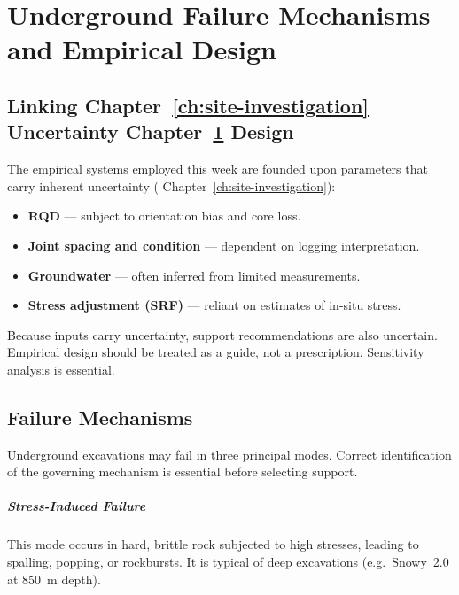 \chapter{Underground Failure Mechanisms and Empirical Design}
\label{ch:empirical-support}

\section{Linking Chapter~\ref{ch:site-investigation} Uncertainty Chapter~\ref{ch:empirical-support} Design}
The empirical systems employed this week are founded upon parameters that carry inherent uncertainty ( Chapter~\ref{ch:site-investigation}):
\begin{itemize}
 \item \textbf{RQD} --- subject to orientation bias and core loss.
 \item \textbf{Joint spacing and condition} --- dependent on logging interpretation.
 \item \textbf{Groundwater} --- often inferred from limited measurements.
 \item \textbf{Stress adjustment (SRF)} --- reliant on estimates of in-situ stress.
\end{itemize}

\begin{warnbox}
Because inputs carry uncertainty, support recommendations are also uncertain. Empirical design should be treated as a guide, not a prescription. Sensitivity analysis is essential.
\end{warnbox}

\section{Failure Mechanisms}
Underground excavations may fail in three principal modes. Correct identification of the governing mechanism is essential before selecting support.

\paragraph{Stress-Induced Failure}
This mode occurs in hard, brittle rock subjected to high stresses, leading to spalling, popping, or rockbursts. It is typical of deep excavations (e.g.\ Snowy~2.0 at 850~m depth).

